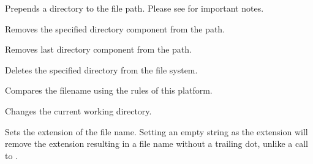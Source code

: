 \label{wxfilenameprependdir}


Prepends a directory to the file path. Please see 
 for important notes.



\label{wxfilenameremovedir}


Removes the specified directory component from the path.




\label{wxfilenameremovelastdir}


Removes last directory component from the path.


\label{wxfilenamermdir}



Deletes the specified directory from the file system.


\label{wxfilenamesameas}


Compares the filename using the rules of this platform.


\label{wxfilenamesetcwd}



Changes the current working directory.


\label{wxfilenamesetext}


Sets the extension of the file name. Setting an empty string
as the extension will remove the extension resulting in a file 
name without a trailing dot, unlike a call to 
.


